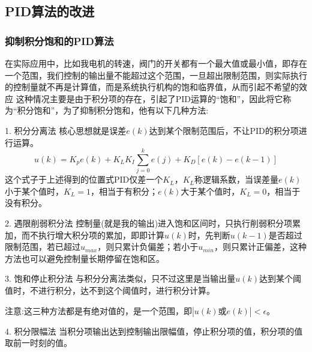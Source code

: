 \documentclass[12pt, a4paper, oneside]{ctexbook}
\begin{document}
\subsection{PID算法的改进} 
\subsubsection{抑制积分饱和的PID算法}
在实际应用中，比如我电机的转速，阀门的开关都有一个最大值或最小值，即存在一个范围，我们控制的输出量不能超过这个范围，一旦超出限制范围，则实际执行的控制量就不再是计算值，而是系统执行机构的饱和临界值，从而引起不希望的效应
这种情况主要是由于积分项的存在，引起了PID运算的“饱和”，因此将它称为“积分饱和”，为了抑制积分饱和，他有以下几种方法:

1. 积分分离法
核心思想就是误差$e(k)$达到某个限制范围后，不让PID的积分项进行运算。
$$
u(k)=K_pe(k)+K_LK_I\sum^{k}_{j=0}e(j)+K_D[e(k)-e(k-1)]
$$
这个式子于上述得到的位置式PID仅差一个$K_L$，$K_L$称逻辑系数，当误差量$e(k)$小于某个值时，$K_L=1$，相当于有积分；$e(k)$大于某个值时，$K_L=0$，相当于没有积分。

2. 遇限削弱积分法
控制量(就是我的输出)进入饱和区间时，只执行削弱积分项累加，而不执行增大积分项的累加，即即计算$u(k)$时，先判断$u(k-1)$是否超过限制范围，若已超过$u_{max}$，则只累计负偏差；若小于$u_{min}$，则只累计正偏差，这种方法也可以避免控制量长期停留在饱和区。

3. 饱和停止积分法
与积分分离法类似，只不过这里是当输出量$u(k)$达到某个阈值时，不进行积分，达不到这个阈值时，进行积分计算。

注意:这三种方法都是有绝对值的，是一个范围，即$|u(k)或e(k)|<\epsilon$。

4. 积分限幅法
当积分项输出达到控制输出限幅值，停止积分项的值，积分项的值取前一时刻的值。
\end{document}
